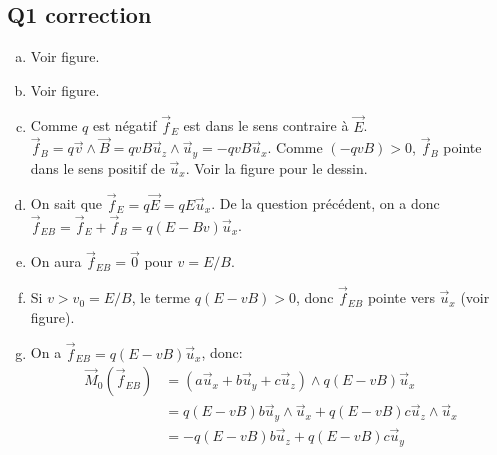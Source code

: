 \documentclass[french,10pt,twocolumn]{article}
\begin{document}
\newpage
\subsection*{Q1 correction}
	\begin{enumerate}[a)]
	\item Voir figure.
	\item Voir figure.
	\item Comme $q$ est négatif $\vec{f}_{E}$ est dans le sens contraire à $\vec{E}$. $\vec{f}_B = q \vec{v} \wedge \vec{B} = q v B \vec{u}_z \wedge \vec{u}_y = - q v B \vec{u}_x$. Comme $(- q v B)>0$, $\vec{f}_B$ pointe dans le sens positif de $\vec{u}_x$. Voir la figure pour le dessin.
	\item On sait que $\vec{f}_E = q \vec{E} = q E \vec{u}_x$. De la question précédent, on a donc $\vec{f}_{EB} = \vec{f}_{E} + \vec{f}_{B} = q (E - Bv) \vec{u}_x$.
	\item  On aura $\vec{f}_{EB} = \vec{0}$ pour $v = E/B$.
	\item Si $v > v_0 = E/B$, le terme $q(E - v B)>0$, donc $\vec{f}_{EB}$ pointe vers $\vec{u}_x$ (voir figure). 
	\item On a $\vec{f}_{EB} = q(E - v B) \vec{u}_x$, donc:
	\begin{align*}
	\vec{M}_0(\vec{f}_{EB}) &= (a\vec{u}_x + b\vec{u}_y + c\vec{u}_z) \wedge q(E - v B) \vec{u}_x \\
	&= q(E - v B) b \vec{u}_y \wedge \vec{u}_x + q(E - v B) c \vec{u}_z \wedge \vec{u}_x \\
	&= -q(E - v B) b \vec{u}_z + q(E - v B) c \vec{u}_y
	\end{align*} 
\end{enumerate} 
\end{document}
